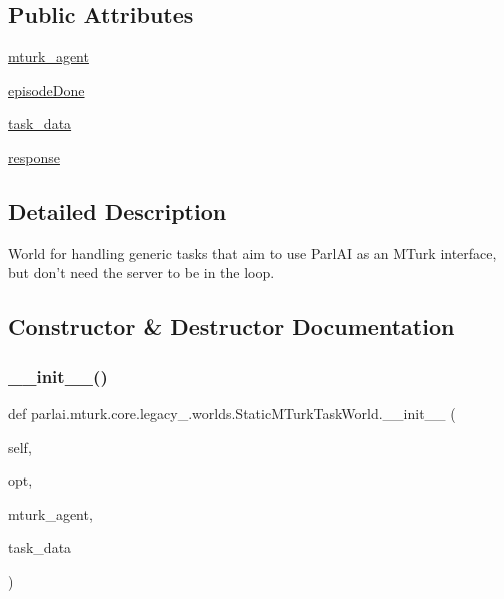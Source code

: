 \subsection*{Public Attributes}
\begin{DoxyCompactItemize}
\item 
\hyperlink{classparlai_1_1mturk_1_1core_1_1legacy__2018_1_1worlds_1_1StaticMTurkTaskWorld_af4bdeb4a05489c01d98ca8251cc2ad97}{mturk\+\_\+agent}
\item 
\hyperlink{classparlai_1_1mturk_1_1core_1_1legacy__2018_1_1worlds_1_1StaticMTurkTaskWorld_a2b173491e6af4ec163df49695ad438b7}{episode\+Done}
\item 
\hyperlink{classparlai_1_1mturk_1_1core_1_1legacy__2018_1_1worlds_1_1StaticMTurkTaskWorld_acc5db69ea637dc47c40833268ce933e9}{task\+\_\+data}
\item 
\hyperlink{classparlai_1_1mturk_1_1core_1_1legacy__2018_1_1worlds_1_1StaticMTurkTaskWorld_ad58aef0c2b48ff7a682082b81d4f25ae}{response}
\end{DoxyCompactItemize}


\subsection{Detailed Description}
\begin{DoxyVerb}World for handling generic tasks that aim to use ParlAI as an MTurk interface, but
don't need the server to be in the loop.
\end{DoxyVerb}
 

\subsection{Constructor \& Destructor Documentation}
\mbox{\label{classparlai_1_1mturk_1_1core_1_1legacy__2018_1_1worlds_1_1StaticMTurkTaskWorld_afca35f07eb86bac34180c21cca0741c2}} 
\subsubsection{\texorpdfstring{\+\_\+\+\_\+init\+\_\+\+\_\+()}{\_\_init\_\_()}}
{\footnotesize\ttfamily def parlai.\+mturk.\+core.\+legacy\+\_.\+worlds.\+Static\+M\+Turk\+Task\+World.\+\_\+\+\_\+init\+\_\+\+\_\+ (\begin{DoxyParamCaption}\item[{}]{self,  }\item[{}]{opt,  }\item[{}]{mturk\+\_\+agent,  }\item[{}]{task\+\_\+data }\end{DoxyParamCaption})}

